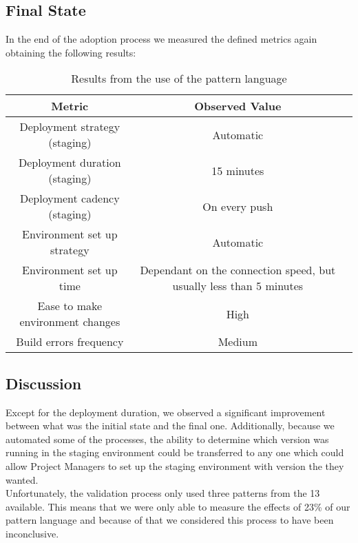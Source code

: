 			\subsection{Final State}
			In the end of the adoption process we measured the defined metrics again obtaining the following results:
			\begin{table}[h!]
				\begin{center}
					\begin{tabular}{| c | c | c |}
						\hline
	 					\textbf{Metric} & \textbf{Observed Value}                       \\ \hline
	 					Deployment strategy (staging) 	    & Automatic                 \\ \hline
						Deployment duration (staging) 	    & 15 minutes                \\ \hline
						Deployment cadency (staging)  	    & On every push             \\ \hline
						Environment set up strategy		    & Automatic                 \\ \hline
						Environment set up time 			    & Dependant on the connection speed, but usually less than 5 minutes  \\ \hline
						Ease to make environment changes    & High                      \\ \hline
						Build errors frequency			    & Medium                    \\ \hline
					\end{tabular}
				\end{center}
				\caption{Results from the use of the pattern language}
				\subsection{Discussion}
				Except for the deployment duration, we observed a significant improvement between what was the initial state and the final one. Additionally, because we automated some of the processes, the ability to determine which version was running in the staging environment could be transferred to any one which could allow Project Managers to set up the staging environment with version the they wanted. \\
				Unfortunately, the validation process only used three patterns from the 13 available. This means that we were only able to measure the effects of 23\% of our pattern language and because of that we considered this process to have been inconclusive.
			\end{table}
